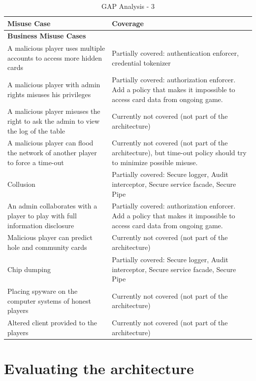 \documentclass[a4paper,11pt]{report}
\begin{document}
\begin{table}[htpb]
\begin{center}
\begin{tabular}{| p{5cm} | p{} |}
\hline
\textbf{Misuse Case} 	& \textbf{Coverage} \\
\hline
\hline
\textbf{Business Misuse Cases} & \\\hline
A malicious player uses multiple accounts to access more hidden cards & Partially covered: authentication enforcer, credential tokenizer \\\hline
A malicious player with admin rights misuses his privileges & Partially covered: authorization enforcer. Add a policy that makes it impossible to access card data from ongoing game. \\\hline
A malicious player misuses the right to ask the admin to view the log of the table & Currently not covered (not part of the architecture) \\\hline
A malicious player can ﬂood the network of another player to force a time-out & Currently not covered (not part of the architecture), but time-out policy should try to minimize possible misuse. \\\hline
Collusion & Partially covered: Secure logger, Audit interceptor, Secure service facade, Secure Pipe \\\hline
An admin collaborates with a player to play with full information disclosure & Partially covered: authorization enforcer. Add a policy that makes it impossible to access card data from ongoing game. \\\hline
Malicious player can predict hole and community cards & Currently not covered (not part of the architecture) \\\hline
Chip dumping & Partially covered: Secure logger, Audit interceptor, Secure service facade, Secure Pipe \\\hline
Placing spyware on the computer systems of honest players & Currently not covered (not part of the architecture) \\\hline
Altered client provided to the players & Currently not covered (not part of the architecture) \\\hline
\end{tabular}
\end{center}
\caption{GAP Analysis - 3}
\label{table:gap3}
\end{table}

\chapter{Evaluating the architecture}
\end{document}
